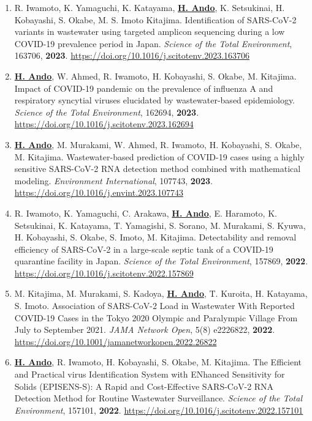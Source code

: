 \documentclass[11pt,a4paper]{article}
\begin{document}
\begin{enumerate}[label=\arabic*., series=pubcount, leftmargin=1.5em, nosep]
    \item R. Iwamoto, K. Yamaguchi, K. Katayama, \textbf{\underline{H. Ando}}, K. Setsukinai, H. Kobayashi, S. Okabe, M. S. Imoto Kitajima. Identification of SARS-CoV-2 variants in wastewater using targeted amplicon sequencing during a low COVID-19 prevalence period in Japan. \textit{Science of the Total Environment}, 163706, \textbf{2023}. \url{https://doi.org/10.1016/j.scitotenv.2023.163706}
    \addtocounter{enumi}{-2}

    \item \textbf{\underline{H. Ando}}, W. Ahmed, R. Iwamoto, H. Kobayashi, S. Okabe, M. Kitajima. Impact of COVID-19 pandemic on the prevalence of influenza A and respiratory syncytial viruses elucidated by wastewater-based epidemiology. \textit{Science of the Total Environment}, 162694, \textbf{2023}. \url{https://doi.org/10.1016/j.scitotenv.2023.162694}
    \addtocounter{enumi}{-2}

    \item \textbf{\underline{H. Ando}}, M. Murakami, W. Ahmed, R. Iwamoto, H. Kobayashi, S. Okabe, M. Kitajima. Wastewater-based prediction of COVID-19 cases using a highly sensitive SARS-CoV-2 RNA detection method combined with mathematical modeling. \textit{Environment International}, 107743, \textbf{2023}. \url{https://doi.org/10.1016/j.envint.2023.107743}
    \addtocounter{enumi}{-2}

    \item R. Iwamoto, K. Yamaguchi, C. Arakawa, \textbf{\underline{H. Ando}}, E. Haramoto, K. Setsukinai, K. Katayama, T. Yamagishi, S. Sorano, M. Murakami, S. Kyuwa, H. Kobayashi, S. Okabe, S. Imoto, M. Kitajima. Detectability and removal efficiency of SARS-CoV-2 in a large-scale septic tank of a COVID-19 quarantine facility in Japan. \textit{Science of the Total Environment}, 157869, \textbf{2022}. \url{https://doi.org/10.1016/j.scitotenv.2022.157869}
    \addtocounter{enumi}{-2}

    \item M. Kitajima, M. Murakami, S. Kadoya, \textbf{\underline{H. Ando}}, T. Kuroita, H. Katayama, S. Imoto. Association of SARS-CoV-2 Load in Wastewater With Reported COVID-19 Cases in the Tokyo 2020 Olympic and Paralympic Village From July to September 2021. \textit{JAMA Network Open}, 5(8) e2226822, \textbf{2022}. \url{https://doi.org/10.1001/jamanetworkopen.2022.26822}
    \addtocounter{enumi}{-2}

    \item \textbf{\underline{H. Ando}}, R. Iwamoto, H. Kobayashi, S. Okabe, M. Kitajima. The Efficient and Practical virus Identification System with ENhanced Sensitivity for Solids (EPISENS-S): A Rapid and Cost-Effective SARS-CoV-2 RNA Detection Method for Routine Wastewater Surveillance. \textit{Science of the Total Environment}, 157101, \textbf{2022}. \url{https://doi.org/10.1016/j.scitotenv.2022.157101}
    \addtocounter{enumi}{-2}


\end{enumerate}
\end{document}
